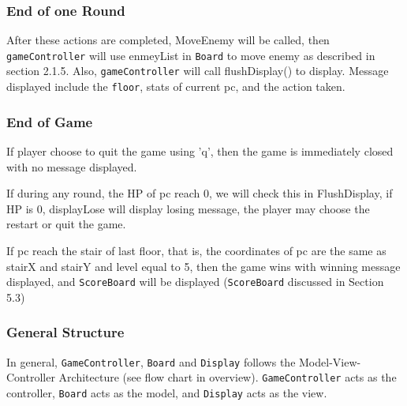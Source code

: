 \documentclass[11pt]{article}
\theoremstyle{plain} \newtheorem{theorem*}{Theorem}[subsection]
\begin{document}
\subsubsection{End of one Round}

After these actions are completed, \textsf{MoveEnemy} will be called,
then \texttt{gameController} will use \textsf{enmeyList} in \texttt{Board}
to move enemy as described in section 2.1.5. Also, \texttt{gameController}
will call \textsf{flushDisplay()} to display. Message displayed include
the \texttt{floor}, stats of current \textsf{pc}, and the action taken.\\

\subsubsection{End of Game}

If player choose to quit the game using 'q', then the game is immediately 
closed with no message displayed.

If during any round, the HP of \textsf{pc} reach 0, we will check this
in \textsf{FlushDisplay}, if HP is 0, \textsf{displayLose} will display
losing message, the player may choose the restart or quit the game.

If \textsf{pc} reach the stair of last floor, that is, the coordinates of
\textsf{pc} are the same as \textsf{stairX} and \textsf{stairY} and 
\textsf{level} equal to 5, then the game wins with winning message displayed,
and \texttt{ScoreBoard} will be displayed (\texttt{ScoreBoard} discussed in
Section 5.3)

\subsubsection{General Structure}
In general, \texttt{GameController}, \texttt{Board} and \texttt{Display} 
follows the Model-View-Controller Architecture (see flow chart in overview). 
\texttt{GameController} acts as the controller, \texttt{Board} acts as the model, 
and \texttt{Display} acts as the view.\\\\










\end{document}
